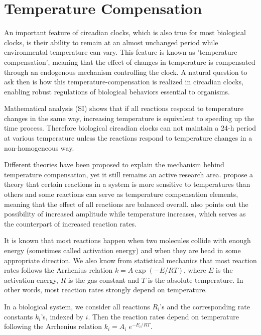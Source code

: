 \documentclass[a4paper,10pt]{article}
\numberwithin{equation}{section}
\begin{document}
\section{Temperature Compensation}
An important feature of circadian clocks, which is also true for most biological clocks, is their ability to remain at an almost unchanged period while environmental temperature can vary. This feature is known as 'temperature compensation', meaning that the effect of changes in temperature is compensated through an endogenous mechanism controlling the clock. A natural question to ask then is how this temperature-compensation is realized in circadian clocks, enabling robust regulations of biological behaviors essential to organisms.


Mathematical analysis (SI) shows that if all reactions respond to temperature changes in the same way, increasing temperature is equivalent to speeding up the time process. Therefore biological circadian clocks can not maintain a 24-h period at various temperature unless the reactions respond to temperature changes in a non-homogeneous way.

Different theories have been proposed to explain the mechanism behind temperature compensation, yet it still remains an active research area. \citet{hastings1957} propose a theory that certain reactions in a system is more sensitive to temperatures than others and some reactions can serve as temperature compensation elements, meaning that the effect of all reactions are balanced overall. \citet{lakin1991} also points out the possibility of increased amplitude while temperature increases, which serves as the counterpart of increased reaction rates. 


It is known that most reactions happen when two molecules collide with enough energy (sometimes called activation energy) and when they are head in some appropriate direction. We also know from statistical mechanics that most reaction rates follows the Arrhenius relation $k=A\exp(-E/RT)$, where $E$ is the activation energy, $R$ is the gas constant and $T$ is the absolute temperature. In other words, most reaction rates strongly depend on temperature.

In a biological system, we consider all reactions $R_i$'s and the corresponding rate constants $k_i$'s, indexed by $i$. Then the reaction rates depend on temperature following the Arrhenius relation $k_i=A_i\; e^{-E_i/RT}$.
\end{document}
